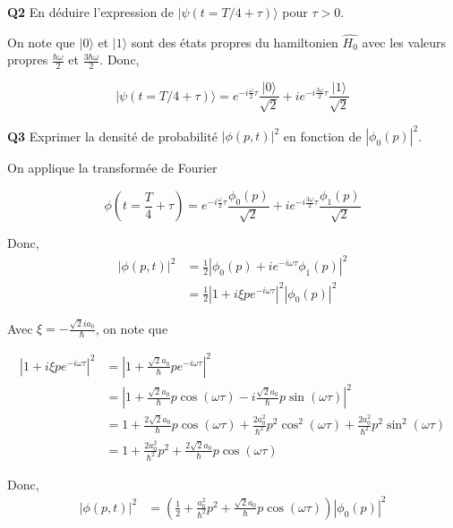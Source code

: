 \documentclass[french]{article}
\begin{document}
	\begin{tcolorbox}[colback=gray!5!white,colframe=gray!75!black]
		\textbf{\large{Q2}} En déduire l'expression de $|\psi(t = T/4 + \tau)\rangle$ pour $\tau > 0$.
	\end{tcolorbox}

	On note que $|0\rangle$ et $|1\rangle$ sont des états propres du hamiltonien $\hat{H_0}$ avec les valeurs propres $\frac{\hbar \omega}{2}$ et $\frac{3 \hbar \omega}{2}$. Donc,

	\[|\psi(t = T/4 + \tau)\rangle = e^{-i\frac{\omega}{2}\tau}\frac{|0\rangle}{\sqrt{2}} + i e^{-i\frac{3\omega}{2}\tau}\frac{|1\rangle}{\sqrt{2}}\]

	\begin{tcolorbox}[colback=gray!5!white,colframe=gray!75!black]
		\textbf{\large{Q3}} Exprimer la densité de probabilité $|\phi(p,t)|^2$ en fonction de $|\phi_0(p)|^2$.
	\end{tcolorbox}

	On applique la transformée de Fourier
	
	\[\phi(t = \frac{T}{4}+\tau) = e^{-i\frac{\omega}{2}\tau}\frac{\phi_0(p)}{\sqrt{2}} + i e^{-i\frac{3\omega}{2}\tau}\frac{\phi_1(p)}{\sqrt{2}}\]
	
	Donc,
	\begin{align}
		|\phi(p, t)|^2 &= \frac{1}{2}\left|\phi_0(p) + ie^{-i\omega\tau}\phi_1(p)\right|^2\\
		&= \frac{1}{2}\left|1 + i\xi pe^{-i\omega\tau}\right|^2 |\phi_0(p)|^2
	\end{align}
	
	Avec $\xi = -\frac{\sqrt{2}ia_0}{\hbar}$, on note que
	
	\begin{align}
		\left|1 + i\xi pe^{-i\omega\tau}\right|^2 &= \left|  1 + \frac{\sqrt{2}a_0}{\hbar}pe^{-i\omega\tau} \right|^2\\
		&= \left|  1 + \frac{\sqrt{2}a_0}{\hbar}p\cos(\omega \tau) - i\frac{\sqrt{2}a_0}{\hbar}p\sin(\omega \tau) \right|^2\\
		&= 1 + \frac{2\sqrt{2}a_0}{\hbar}p\cos(\omega \tau) + \frac{2a_0^2}{\hbar^2}p^2\cos^2(\omega \tau) +  \frac{2a_0^2}{\hbar^2}p^2\sin^2(\omega \tau)\\
		&= 1 + \frac{2a_0^2}{\hbar^2}p^2 + \frac{2\sqrt{2}a_0}{\hbar}p\cos(\omega \tau)
	\end{align}
	
	Donc, 
	\begin{align}
	|\phi(p, t)|^2 &= \left(\frac{1}{2} + \frac{a_0^2}{\hbar^2}p^2 + \frac{\sqrt{2}a_0}{\hbar}p\cos(\omega \tau)\right) |\phi_0(p)|^2
	\end{align}
\end{document}
